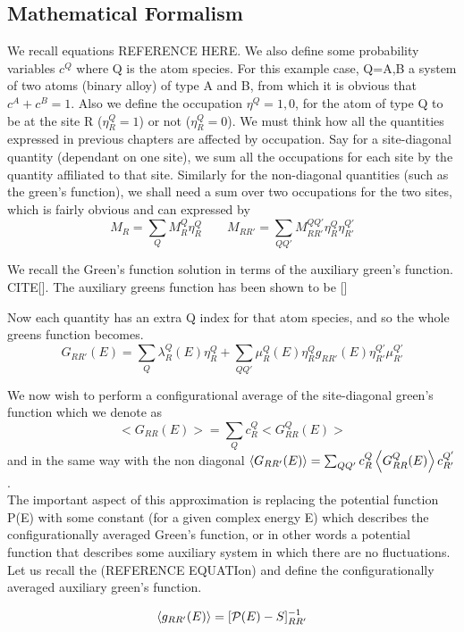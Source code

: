 \documentclass[12pt]{article}
\begin{document}
\subsection{Mathematical Formalism}

We recall equations REFERENCE HERE. We also define some probability variables $c^Q$ where Q is the atom species. For this example case, Q=A,B a system of two atoms (binary alloy) of type A and B, from which it is obvious that $c^A+c^B=1$. Also we define the occupation $\eta^Q={1,0}$, for the atom of type Q to be at the site R ($\eta_R^Q=1$) or not ($\eta_R^Q=0$). We must think how all the quantities expressed in previous chapters are affected by occupation. Say for a site-diagonal quantity (dependant on one site), we sum all the occupations for each site by the quantity affiliated to that site. Similarly for the non-diagonal quantities (such as the green's function), we shall need a sum over two occupations for the two sites, which is fairly obvious and can expressed by
$$M_R=\sum_Q M_R^Q \eta_R^Q \qquad M_{RR'}=\sum_{QQ'} M_{RR'}^{QQ'} \eta_R^Q \eta_{R'}^{Q'} $$

We recall the Green's function solution in terms of the auxiliary green's function. CITE[].
The auxiliary greens function has been shown to be []

Now each quantity has an extra Q index for that atom species, and so the whole greens function becomes.
$$G_{RR'}(E)= \sum_Q \lambda_R^Q(E)\eta_R^Q +\sum_{QQ'} \mu_R^Q(E) \eta_R^Q g_{RR'}(E) \eta_{R'}^{Q'} \mu_{R'}^{Q'}$$

We now wish to perform a configurational average of the site-diagonal green's function which we denote as $$<G_{RR}(E)>= \sum_Q c_R^Q <G_{RR}^Q(E)>$$ and in the same way with the non diagonal $\expval{G_{RR'}(E)}= \sum_{QQ'} c_R^Q \expval{G_{RR}^Q(E)} c_{R'}^{Q'}$.
\\ 
The important aspect of this approximation is replacing the potential function P(E) with some constant (for a given complex energy E) which describes the configurationally averaged Green's function, or in other words a potential function that describes some auxiliary system in which there are no fluctuations. Let us recall the (REFERENCE EQUATIon) and define the configurationally averaged auxiliary green's function.

$$\expval{g_{RR'}(E)}=[\mathcal{P}(E)-S]^{-1}_{RR'}$$
\end{document}
